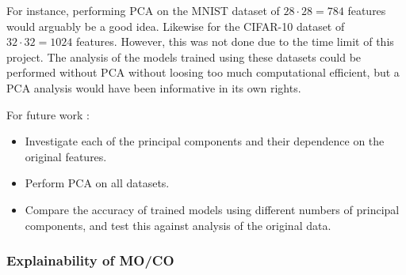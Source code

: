     For instance, performing PCA on the MNIST dataset of $28\cdot 28 = 784$ features would arguably be a good idea. Likewise for the CIFAR-10 dataset of $32\cdot 32 = 1024$ features. However, this was not done due to the time limit of this project. The analysis of the models trained using these datasets could be performed without PCA without loosing too much  computational efficient, but a PCA analysis would have been  informative in its own rights. 
    
    For future work :
    \begin{itemize}
        \item Investigate each of the principal components and their dependence on the original features. 
        \item Perform PCA on all datasets. 
        \item Compare the accuracy of trained models using different numbers of principal components, and test this against analysis of the original data. 
    \end{itemize}


    

\subsubsection{Explainability of MO/CO}
